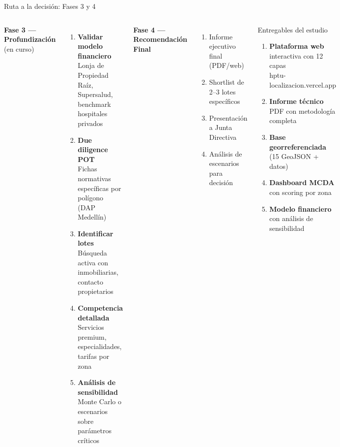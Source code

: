 \documentclass[aspectratio=169, 11pt]{beamer}
\begin{document}
\begin{frame}{Ruta a la decisión: Fases 3 y 4}

\begin{columns}[T]
\textbf{Fase 3 --- Profundización} {\small(en curso)}

\vspace{4pt}
\begin{enumerate}\footnotesize
  \item[\textcolor{teal}{1.}] \textbf{Validar modelo financiero}\\
    {\scriptsize Lonja de Propiedad Raíz, Supersalud, benchmark hospitales privados}
  \item[\textcolor{teal}{2.}] \textbf{Due diligence POT}\\
    {\scriptsize Fichas normativas específicas por polígono (DAP Medellín)}
  \item[\textcolor{teal}{3.}] \textbf{Identificar lotes}\\
    {\scriptsize Búsqueda activa con inmobiliarias, contacto propietarios}
  \item[\textcolor{teal}{4.}] \textbf{Competencia detallada}\\
    {\scriptsize Servicios premium, especialidades, tarifas por zona}
  \item[\textcolor{teal}{5.}] \textbf{Análisis de sensibilidad}\\
    {\scriptsize Monte Carlo o escenarios sobre parámetros críticos}
\end{enumerate}

\vspace{6pt}
\textbf{Fase 4 --- Recomendación Final}

\vspace{4pt}
\begin{enumerate}\footnotesize
  \item[\textcolor{hptu}{1.}] Informe ejecutivo final (PDF/web)
  \item[\textcolor{hptu}{2.}] Shortlist de 2--3 lotes específicos
  \item[\textcolor{hptu}{3.}] Presentación a Junta Directiva
  \item[\textcolor{hptu}{4.}] Análisis de escenarios para decisión
\end{enumerate}

\begin{block}{\small Entregables del estudio}
\footnotesize
\begin{enumerate}
  \item \textbf{Plataforma web} interactiva con 12 capas\\
    {\scriptsize hptu-localizacion.vercel.app}
  \item \textbf{Informe técnico} PDF con metodología completa
  \item \textbf{Base georreferenciada} (15 GeoJSON + datos)
  \item \textbf{Dashboard MCDA} con scoring por zona
  \item \textbf{Modelo financiero} con análisis de sensibilidad
\end{enumerate}
\end{block}


\end{columns}
\end{frame}
\end{document}
